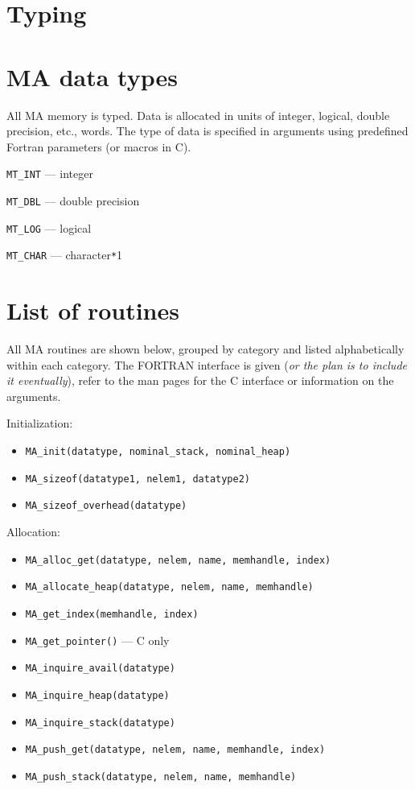\section{Typing}

\section{MA data types}

All MA memory is typed.  Data is allocated in units of integer,
logical, double precision, etc., words.  The type of data is specified
in arguments using predefined Fortran parameters (or macros in C).
\begin{description}
\item{\verb+MT_INT+} --- integer
\item{\verb+MT_DBL+} --- double precision
\item{\verb+MT_LOG+} --- logical
\item{\verb+MT_CHAR+} --- character\verb+*+1
\end{description}

\section{List of routines}

All MA routines are shown below, grouped by category and listed
alphabetically within each category.  The FORTRAN interface is given
({\em or the plan is to include it eventually}),
refer to the man pages for the C interface or information on the
arguments.

Initialization: 
\begin{itemize}
\item {\tt MA\_init(datatype, nominal\_stack, nominal\_heap)}
\item {\tt MA\_sizeof(datatype1, nelem1, datatype2)}
\item {\tt MA\_sizeof\_overhead(datatype)}
\end{itemize}

Allocation:
\begin{itemize}
\item {\tt MA\_alloc\_get(datatype, nelem, name, memhandle, index)}
\item {\tt MA\_allocate\_heap(datatype, nelem, name, memhandle)}
\item {\tt MA\_get\_index(memhandle, index)}
\item {\tt MA\_get\_pointer()} --- C only
\item {\tt MA\_inquire\_avail(datatype)}
\item {\tt MA\_inquire\_heap(datatype)}
\item {\tt MA\_inquire\_stack(datatype)}
\item {\tt MA\_push\_get(datatype, nelem, name, memhandle, index)}
\item {\tt MA\_push\_stack(datatype, nelem, name, memhandle)}
\end{itemize}

